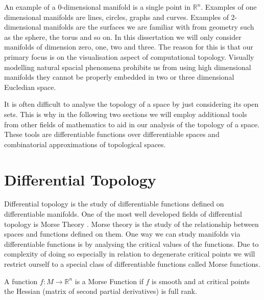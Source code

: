 An example of a 0-dimensional manifold is a single point in $\mathbb{R}^n$. Examples of one dimensional manifolds are lines, circles, graphs and curves. Examples of 2-dimensional manifolds are the surfaces we are familiar with from geometry such as the sphere, the torus and so on. In this dissertation we will only consider manifolds of dimension zero, one, two and three. The reason for this is that our primary focus is on the visualisation aspect of computational topology. Visually modelling natural spacial phenomena prohibits us from using high dimensional manifolds they cannot be properly embedded in two or three dimensional Eucledian space.


It is often difficult to analyse the topology of a space by just considering its open sets. This is why in the following two sections we will employ additional tools from other fields of mathematics to aid in our analysis of the topology of a space. These tools are differentiable functions over differentiable spaces and combinatorial approximations of topological spaces.


\section{Differential Topology}

Differential topology is the study of differentiable functions defined on differentiable manifolds. One of the most well developed fields of differential topology is Morse Theory \cite{morse-theory-book, morse-theory-book-milnor}. Morse theory is the study of the relationship between spaces and functions defined on them. One way we can study manifolds via differentiable functions is by analysing the critical values of the functions. Due to complexity of doing so especially in relation to degenerate critical points we will restrict ourself to a special class of differentiable functions called Morse functions.



\begin{defn} A function $f: M \to \mathbb{R}^n$ is a Morse Function if $f$ is smooth and at critical points the Hessian (matrix of second partial derivatives) is full rank.   \end{defn}

